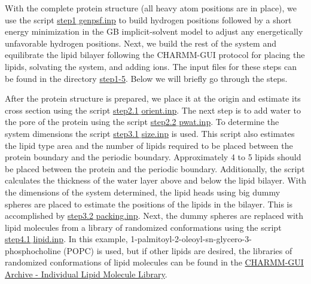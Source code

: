 With the complete protein structure (all heavy atom positions
are in place), we use the script
\href{https://gitlab.com/shenlab-amber-cphmd/cphmd-tutorial/-/tree/main/memb_hphmd_charmm/initial_system_prep/step1-5/step1_genpsf.inp}{step1$\_$genpsf.inp} to build
hydrogen positions followed by a short energy minimization in the GB implicit-solvent model to adjust any energetically
unfavorable hydrogen positions.
Next, we build the rest of the system and equilibrate the
lipid bilayer
following the CHARMM-GUI protocol \cite{Jo_Im_2007_PLoSONE}
for placing the lipids, solvating the system, and adding ions. 
The input files for these steps can be found in the directory \href{https://gitlab.com/shenlab-amber-cphmd/cphmd-tutorial/-/tree/main/memb_hphmd_charmm/initial_system_prep/step1-5}{step1-5}.
Below we will briefly go through the steps.

After the protein structure is prepared, we 
place it at the origin and estimate its 
cross section using the script
\href{https://gitlab.com/shenlab-amber-cphmd/cphmd-tutorial/-/tree/main/memb_hphmd_charmm/initial_system_prep/step1-5/step2.1_orient.inp}{step2.1$\_$orient.inp}. 
The next step is to add water to the pore of the protein 
using the script \href{https://gitlab.com/shenlab-amber-cphmd/cphmd-tutorial/-/tree/main/memb_hphmd_charmm/initial_system_prep/step1-5/step2.2_pwat.inp}{step2.2$\_$pwat.inp}.
To determine the system dimensions the script \href{https://gitlab.com/shenlab-amber-cphmd/cphmd-tutorial/-/tree/main/memb_hphmd_charmm/initial_system_prep/step1-5/step3.1_size.inp}{step3.1$\_$size.inp} is used. 
This script also estimates the lipid type area and the number of lipids required to be placed between the protein boundary and the periodic boundary. 
Approximately 4 to 5 lipids should be placed between the protein and the periodic boundary. 
Additionally, the script calculates the thickness of the water layer above and below the lipid bilayer. 
With the dimensions of the system determined, the lipid heads using big dummy spheres are placed to estimate the positions of the lipids in the bilayer. This is accomplished by \href{https://gitlab.com/shenlab-amber-cphmd/cphmd-tutorial/-/tree/main/memb_hphmd_charmm/initial_system_prep/step1-5/step3.2_packing.inp}{step3.2$\_$packing.inp}.
Next, the dummy spheres are replaced with lipid molecules from a library of randomized conformations using the script \href{https://gitlab.com/shenlab-amber-cphmd/cphmd-tutorial/-/tree/main/memb_hphmd_charmm/initial_system_prep/step1-5/step4.1_lipid.inp}{step4.1$\_$lipid.inp}.
In this example, 1-palmitoyl-2-oleoyl-sn-glycero-3-phosphocholine (POPC) is used, but if other lipids are desired,
the libraries of randomized conformations of lipid molecules can be found in the \href{https://www.charmm-gui.org/?doc=archive&lib=lipid}{CHARMM-GUI Archive - Individual Lipid Molecule Library}.

